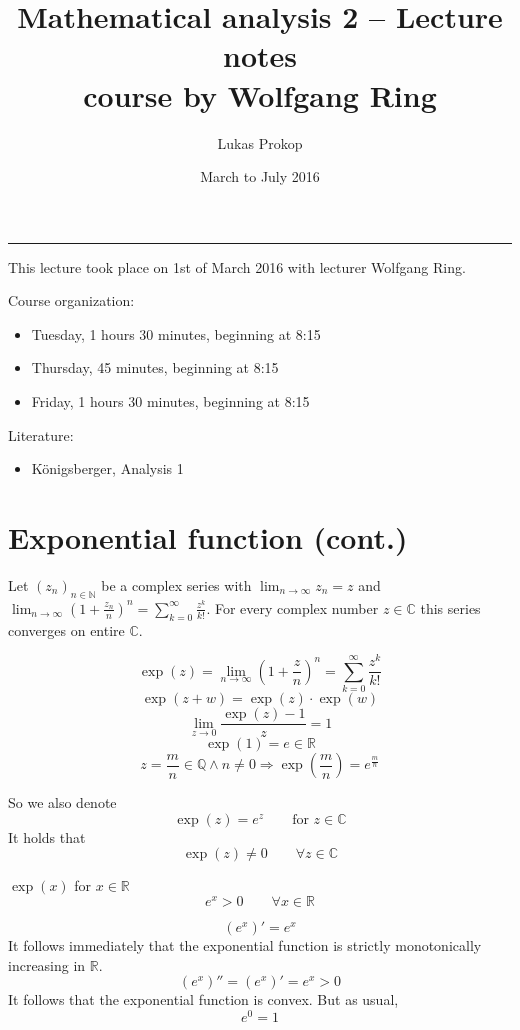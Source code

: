 \documentclass[a4paper,landscape,twocolumn]{article}
\title{
  Mathematical analysis 2 -- Lecture notes \\
  \small{course by Wolfgang Ring}
}
\author{Lukas Prokop}
\date{March to July 2016}
\theoremstyle{definition}
\newcommand\meta[3]{\hrule{} This #1 took place on #2 with lecturer #3.\par}
\begin{document}
\maketitle
\tableofcontents

\clearpage
\meta{lecture}{1st of March 2016}{Wolfgang Ring}

Course organization:
\begin{itemize}
  \item Tuesday, 1 hours 30 minutes, beginning at 8:15
  \item Thursday, 45 minutes, beginning at 8:15
  \item Friday, 1 hours 30 minutes, beginning at 8:15
\end{itemize}

Literature:
\begin{itemize}
  \item Königsberger, Analysis 1
\end{itemize}

\clearpage
\section{Exponential function (cont.)}
%
Let $(z_n)_{n \in \mathbb N}$ be a complex series with $\lim_{n\to\infty} z_n = z$
and $\lim_{n\to\infty} (1 + \frac{z_n}{n})^n = \sum_{k=0}^\infty \frac{z^k}{k!}$.
For every complex number $z \in \mathbb C$ this series converges on entire $\mathbb C$.

\[ \exp(z) = \lim_{n\to\infty} \left(1 + \frac{z}n\right)^n = \sum_{k=0}^\infty \frac{z^k}{k!} \]
\[ \exp(z + w) = \exp(z) \cdot \exp(w) \]
\[ \lim_{z\to0} \frac{\exp(z) - 1}{z} = 1 \]
\[ \exp(1) = e \in \mathbb R \]
\[ z = \frac mn \in \mathbb Q \land n \neq 0 \Rightarrow \exp\left(\frac mn\right) = e^{\frac mn} \]

So we also denote
\[ \exp(z) = e^z \qquad \text{for } z \in \mathbb C \]
It holds that
\[ \exp(z) \neq 0 \qquad \forall z \in \mathbb C \]

$\exp(x)$ for $x \in \mathbb R$
\[ e^x > 0 \qquad \forall x \in \mathbb R \]

\[ (e^x)' = e^x \]
It follows immediately that the exponential function is strictly monotonically increasing in $\mathbb R$.
\[ (e^x)'' = (e^x)' = e^x > 0 \]
It follows that the exponential function is convex. But as usual,
\[ e^0 = 1 \]
\end{document}
